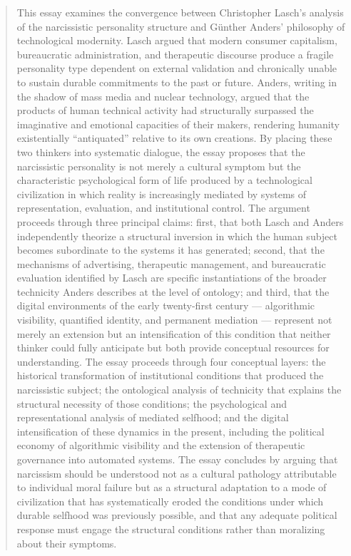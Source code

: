 \documentclass[12pt]{memoir}
\begin{document}
\begin{abstract}
\noindent
This essay examines the convergence between Christopher Lasch's analysis of the narcissistic
personality structure and Günther Anders' philosophy of technological modernity. Lasch argued
that modern consumer capitalism, bureaucratic administration, and therapeutic discourse produce
a fragile personality type dependent on external validation and chronically unable to sustain
durable commitments to the past or future. Anders, writing in the shadow of mass media and
nuclear technology, argued that the products of human technical activity had structurally
surpassed the imaginative and emotional capacities of their makers, rendering humanity
existentially \enquote{antiquated} relative to its own creations. By placing these two thinkers
into systematic dialogue, the essay proposes that the narcissistic personality is not merely a
cultural symptom but the characteristic psychological form of life produced by a technological
civilization in which reality is increasingly mediated by systems of representation, evaluation,
and institutional control. The argument proceeds through three principal claims: first, that
both Lasch and Anders independently theorize a structural inversion in which the human subject
becomes subordinate to the systems it has generated; second, that the mechanisms of advertising,
therapeutic management, and bureaucratic evaluation identified by Lasch are specific
instantiations of the broader technicity Anders describes at the level of ontology; and third,
that the digital environments of the early twenty-first century — algorithmic visibility,
quantified identity, and permanent mediation — represent not merely an extension but an
intensification of this condition that neither thinker could fully anticipate but both provide
conceptual resources for understanding. The essay proceeds through four conceptual layers: the
historical transformation of institutional conditions that produced the narcissistic subject;
the ontological analysis of technicity that explains the structural necessity of those
conditions; the psychological and representational analysis of mediated selfhood; and the
digital intensification of these dynamics in the present, including the political economy of
algorithmic visibility and the extension of therapeutic governance into automated systems.
The essay concludes by arguing that narcissism should be understood not as a cultural
pathology attributable to individual moral failure but as a structural adaptation to a mode of
civilization that has systematically eroded the conditions under which durable selfhood was
previously possible, and that any adequate political response must engage the structural
conditions rather than moralizing about their symptoms.
\end{abstract}
\end{document}
